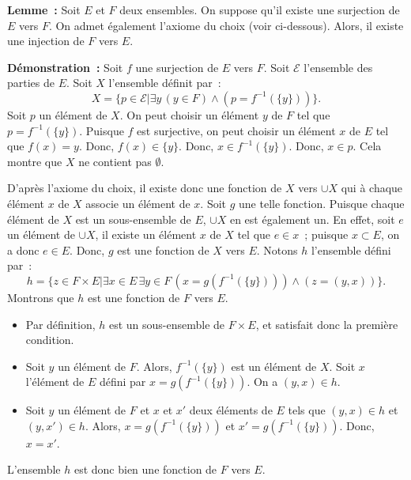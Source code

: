\done

\medskip

\noindent\textbf{Lemme :} 
Soit $E$ et $F$ deux ensembles. 
On suppose qu'il existe une surjection de $E$ vers $F$. 
On admet également l'axiome du choix (voir ci-dessous). 
Alors, il existe une injection de $F$ vers $E$. 

\medskip

\noindent\textbf{Démonstration :} 
    Soit $f$ une surjection de $E$ vers $F$.
    Soit $\mathcal{E}$ l'ensemble des parties de $E$. 
    Soit $X$ l'ensemble définit par : 
    \begin{equation*}
        X = \lbrace
                p \in \mathcal{E} \vert
                \exists y \, (y \in F) \wedge (p = f^{-1}(\lbrace y \rbrace))
            \rbrace .
    \end{equation*}
    Soit $p$ un élément de $X$.
    On peut choisir un élément $y$ de $F$ tel que $p = f^{-1}(\lbrace y \rbrace)$.
    Puisque $f$ est surjective, on peut choisir un élément $x$ de $E$ tel que $f(x) = y$.
    Donc, $f(x) \in \lbrace y \rbrace$.
    Donc, $x \in f^{-1}(\lbrace y \rbrace)$.
    Donc, $x \in p$.
    Cela montre que $X$ ne contient pas $\emptyset$.

    D'après l'axiome du choix, il existe donc une fonction de $X$ vers $\cup X$ qui à chaque élément $x$ de $X$ associe un élément de $x$. 
    Soit $g$ une telle fonction.
    Puisque chaque élément de $X$ est un sous-ensemble de $E$, $\cup X$ en est également un. 
    En effet, soit $e$ un élément de $\cup X$, il existe un élément $x$ de $X$ tel que $e \in x$ ; puisque $x \subset E$, on a donc $e \in E$.
    Donc, $g$ est une fonction de $X$ vers $E$.
    Notons $h$ l'ensemble défini par :
    \begin{equation*}
        h = \lbrace 
                z \in F \times E \vert
                \exists x \in E \, \exists y \in F \, 
                (x = g (f^{-1}(\lbrace y \rbrace))) \wedge (z = (y,x))
            \rbrace.
    \end{equation*}
    Montrons que $h$ est une fonction de $F$ vers $E$.
    \begin{itemize}[nosep]
        \item Par définition, $h$ est un sous-ensemble de $F \times E$, et satisfait donc la première condition.
        \item Soit $y$ un élément de $F$. 
            Alors, $f^{-1}(\lbrace y \rbrace)$ est un élément de $X$.
            Soit $x$ l'élément de $E$ défini par $x = g(f^{-1}(\lbrace y \rbrace))$.
            On a $(y,x) \in h$.
        \item Soit $y$ un élément de $F$ et $x$ et $x'$ deux éléments de $E$ tels que $(y,x) \in h$ et $(y,x') \in h$.
            Alors, $x = g (f^{-1}(\lbrace y \rbrace))$ et $x' = g (f^{-1}(\lbrace y \rbrace))$.
            Donc, $x = x'$.
    \end{itemize}
    L'ensemble $h$ est donc bien une fonction de $F$ vers $E$.

